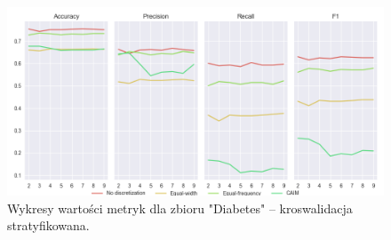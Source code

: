 \begin{figure}[H]
\center
    \includegraphics[width=\textwidth]{img/cv_scores_stratifiedkfold/scoring_stratifiedkfold_diabetes.png}
    \caption{Wykresy wartości metryk dla zbioru "Diabetes" -- kroswalidacja stratyfikowana.}
\end{figure}

